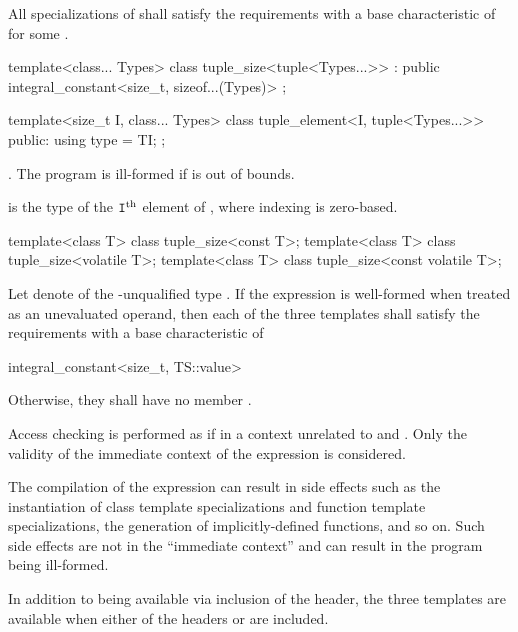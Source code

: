 \begin{itemdescr}
\pnum
\remarks All specializations of  shall satisfy the
 requirements with a
base characteristic of 
for some .
\end{itemdescr}

%
\begin{itemdecl}
template<class... Types>
  class tuple_size<tuple<Types...>> : public integral_constant<size_t, sizeof...(Types)> { };
\end{itemdecl}

%
\begin{itemdecl}
template<size_t I, class... Types>
  class tuple_element<I, tuple<Types...>> {
  public:
    using type = TI;
  };
\end{itemdecl}

\begin{itemdescr}
\pnum
\requires {}.
The program is ill-formed if  is out of bounds.

\pnum
\ctype {} is the
type of the $\texttt{I}^\text{th}$ element of ,
where indexing is zero-based.
\end{itemdescr}

%
\begin{itemdecl}
template<class T> class tuple_size<const T>;
template<class T> class tuple_size<volatile T>;
template<class T> class tuple_size<const volatile T>;
\end{itemdecl}

\begin{itemdescr}
\pnum
Let  denote  of the \cv-unqualified type .
If the expression  is well-formed
when treated as an unevaluated operand, then each
of the three templates shall satisfy the  requirements
with a base characteristic of
\begin{codeblock}
integral_constant<size_t, TS::value>
\end{codeblock}
Otherwise, they shall have no member .

\pnum
Access checking is performed as if in a context
unrelated to  and .
Only the validity of the immediate context of the expression is considered.
\begin{note}
The compilation of the expression can result in side effects
such as the instantiation of class template specializations and
function template specializations, the generation of implicitly-defined functions, and so on.
Such side effects are not in the ``immediate context'' and
can result in the program being ill-formed.
\end{note}

\pnum
In addition to being available via inclusion of the  header,
the three templates are available when either of the headers  or
 are included.
\end{itemdescr}


